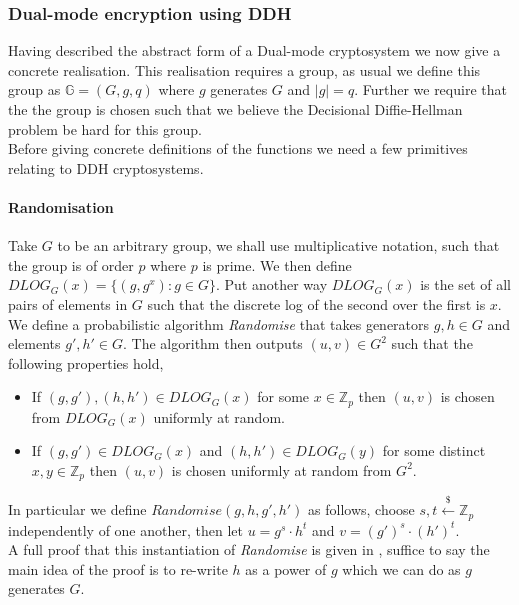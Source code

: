 \documentclass[ %
                    author={Nicholas Tutte},
                supervisor={Prof. Nigel Smart},
                    degree={MEng},
                     title={Secure Two Party Computation},
                  subtitle={A practical comparison of recent protocols},
                      type={Research - GG1K},
                      year={2015} ]{dissertation}
\begin{document}
				\subsubsection{Dual-mode encryption using DDH}

					Having described the abstract form of a Dual-mode cryptosystem we now give a concrete realisation. This realisation requires a group, as usual we define this group as $\mathbb{G} = (G, g, q)$ where $g$ generates $G$ and $|g| = q$. Further we require that the the group is chosen such that we believe the Decisional Diffie-Hellman problem be hard for this group.\\

					Before giving concrete definitions of the functions we need a few primitives relating to DDH cryptosystems.\\
					
					\paragraph{Randomisation} Take $G$ to be an arbitrary group, we shall use multiplicative notation, such that the group is of order $p$ where $p$ is prime. We then define $DLOG_G(x) = \{ (g, g^x) : g \in G\}$. Put another way $DLOG_G(x)$ is the set of all pairs of elements in $G$ such that the discrete log of the second over the first is $x$.\\
					
					We define a probabilistic algorithm \emph{Randomise} that takes generators $g,h \in G$ and elements $g', h' \in G$. The algorithm then outputs $(u, v) \in G^2$ such that the following properties hold,
					
					\begin{itemize}
						\item If $(g, g'), (h, h') \in DLOG_G(x)$ for some $x \in \mathbb{Z}_p$ then $(u, v)$ is chosen from $DLOG_G(x)$ uniformly at random.

						\item If $(g, g')\in DLOG_G(x)$ and $(h, h') \in DLOG_G(y)$ for some distinct $x, y \in \mathbb{Z}_p$ then $(u, v)$ is chosen uniformly at random from $G^2$.
					\end{itemize}

					In particular we define $Randomise(g, h, g', h')$ as follows, choose $s, t \xleftarrow{\$} \mathbb{Z}_p$ independently of one another, then let $u = g^s \cdot h^t$ and $v = (g')^s \cdot (h')^t$.\\
					A full proof that this instantiation of \emph{Randomise} is given in \cite{PVW_OT_2008}, suffice to say the main idea of the proof is to re-write $h$ as a power of $g$ which we can do as $g$ generates $G$.\\
\end{document}

